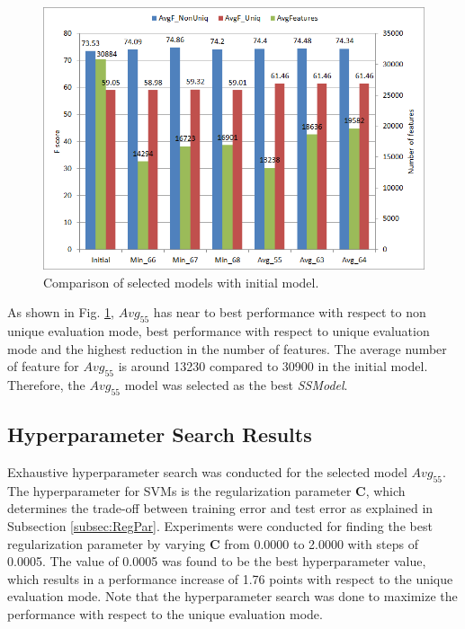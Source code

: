 \begin{figure}
\centering
\includegraphics[scale=0.6]{figures/6ModelsComparison.png}
\caption{Comparison of selected models with initial model.}\label{fig:6ModelsComp}
\end{figure}

As shown in Fig. \ref{fig:6ModelsComp}, $Avg_{55}$ has near to best performance with respect to non unique evaluation mode, best performance with respect to unique evaluation mode and the highest reduction in the number of features. The average number of feature for $Avg_{55}$ is around 13230 compared to 30900 in the initial model. Therefore, the $Avg_{55}$ model was selected as the best \textit{SSModel}.


\subsection{Hyperparameter Search Results}

Exhaustive hyperparameter search was conducted for the selected model $Avg_{55}$. The hyperparameter for SVMs is the regularization parameter $\mathbf{C}$, which determines the trade-off between training error and test error as explained in Subsection \ref{subsec:RegPar}. Experiments were conducted for finding the best regularization parameter by varying $\mathbf{C}$ from 0.0000 to 2.0000 with steps of 0.0005. The value of 0.0005 was found to be the best hyperparameter value, which results in a performance increase of 1.76 points with respect to the unique evaluation mode. Note that the hyperparameter search was done to maximize the performance with respect to the unique evaluation mode.

